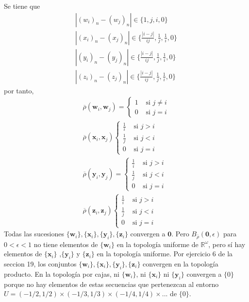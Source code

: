 \documentclass{article}
\newcommand{\vect}[1]{\boldsymbol{#1}}
\begin{document}
Se tiene que
\begin{eqnarray}
|(w_i)_n-(w_j)_n|\in \{1,j,i,0\}\nonumber\\
|(x_i)_n-(x_j)_n|\in \{\frac{|i-j|}{ij},\frac{1}{j},\frac{1}{i},0\}\nonumber\\
|(y_i)_n-(y_j)_n|\in \{\frac{|i-j|}{ij},\frac{1}{j},\frac{1}{i},0\}\nonumber\\
|(z_i)_n-(z_j)_n|\in \{\frac{|i-j|}{ij},\frac{1}{j},\frac{1}{i},0\}\nonumber
\end{eqnarray}
por tanto,
\begin{eqnarray}
\overline{\rho}(\vect{w}_i,\vect{w}_j)=\begin{cases}
1&\text{ si }j\neq i\nonumber\\
0&\text{ si }j = i\nonumber
\end{cases}\nonumber\\
\overline{\rho}(\vect{x}_i,\vect{x}_j)
\begin{cases}
\frac{1}{i}&\text{ si }j> i\nonumber\\
\frac{1}{j}&\text{ si }j< i\nonumber\\
0&\text{ si }j = i\nonumber
\end{cases}\nonumber\\
\overline{\rho}(\vect{y}_i,\vect{y}_j)=\begin{cases}
\frac{1}{i}&\text{ si }j> i\nonumber\\
\frac{1}{j}&\text{ si }j< i\nonumber\\
0&\text{ si }j = i\nonumber
\end{cases}\nonumber\\
\overline{\rho}(\vect{z}_i,\vect{z}_j)\begin{cases}\frac{1}{i}&\text{ si }j> i\nonumber\\
\frac{1}{j}&\text{ si }j< i\nonumber\\
0&\text{ si }j = i\nonumber
\end{cases}
\nonumber
\end{eqnarray}
Todas las sucesiones $\{\vect{w}_i\},\{\vect{x}_i\},\{\vect{y}_i\},\{\vect{z}_i\}$ convergen a $\vect{0}$. Pero $B_{\overline{\rho}}(\vect{0},\epsilon)$ para $0<\epsilon<1$ no tiene elementos de $\{\vect{w}_i\}$ en la topología uniforme de $\mathbb{R}^\omega$, pero sí hay elementos de $\{\vect{x}_i\}$ ,$\{\vect{y}_i\}$ y $\{\vect{z}_i\}$ en la topología uniforme. Por ejercicio 6 de la seccion 19, los conjuntos $\{\vect{w}_i\},\{\vect{x}_i\},\{\vect{y}_i\},\{\vect{z}_i\}$ convergen en la topología producto. En la topología por cajas,  ni $\{\vect{w}_i\}$, ni $\{\vect{x}_i\}$ ni $\{\vect{y}_i\}$ convergen a $\{0\}$ porque no hay elementos de estas secuencias que pertenezcan al entorno $U=(-1/2,1/2)\times (-1/3,1/3)\times (-1/4,1/4)\times...$ de $\{0\}$.
\end{document}
